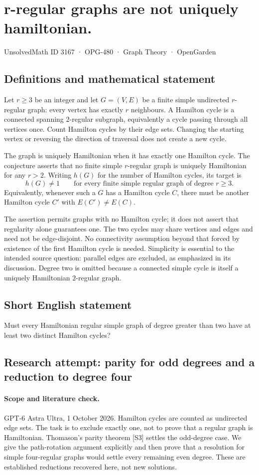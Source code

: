 \documentclass[11pt,a4paper]{article}
\begin{document}
\section*{r-regular graphs are not uniquely hamiltonian.}\label{3167}
{\small UnsolvedMath ID 3167 · OPG-480 · Graph Theory · OpenGarden}
\subsection{Definitions and mathematical statement}
Let $r\geq3$ be an integer and let $G=(V,E)$ be a finite simple
undirected $r$-regular graph: every vertex has exactly $r$
neighbours. A Hamilton cycle is a connected spanning
$2$-regular subgraph, equivalently a cycle passing through
all vertices once. Count Hamilton cycles by their edge sets.
Changing the starting vertex or reversing the direction of
traversal does not create a new cycle.

The graph is uniquely Hamiltonian when it has exactly one
Hamilton cycle. The conjecture asserts that no finite simple
$r$-regular graph is uniquely Hamiltonian for any $r>2$.
Writing $h(G)$ for the number of Hamilton cycles, its target
is
\[
 h(G)\neq1\qquad
 \text{for every finite simple regular graph of degree }r\geq3.
\]
Equivalently, whenever such a $G$ has a Hamilton cycle $C$,
there must be another Hamilton cycle $C'$ with
$E(C')\neq E(C)$.

The assertion permits graphs with no Hamilton cycle; it
does not assert that regularity alone guarantees one. The
two cycles may share vertices and edges and need not be
edge-disjoint. No connectivity assumption beyond that
forced by existence of the first Hamilton cycle is needed.
Simplicity is essential to the intended source question:
parallel edges are excluded, as emphasized in its discussion.
Degree two is omitted because a connected simple cycle is
itself a uniquely Hamiltonian $2$-regular graph.
\subsection{Short English statement}
Must every Hamiltonian regular simple graph of degree greater than two have at least two distinct Hamilton cycles?
\subsection{Research attempt: parity for odd degrees and a reduction to degree four}
\paragraph{Scope and literature check.}
GPT-6 Astra Ultra, 1 October 2026. Hamilton cycles are counted as
undirected edge sets. The task is to exclude exactly one, not to
prove that a regular graph is Hamiltonian. Thomason's parity theorem
[S3] settles the odd-degree case. We give the path-rotation argument
explicitly and then prove that a resolution for simple four-regular
graphs would settle every remaining even degree. These are established
reductions recovered here, not new solutions.
\end{document}
